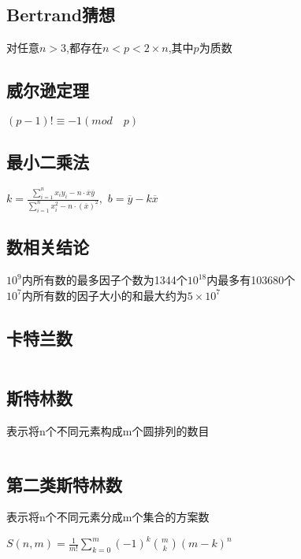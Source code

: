 \documentclass[twocolumn,a4]{article}
\begin{document}
\subsection{Bertrand猜想}
对任意$n>3$,都存在$n<p<2\times n$,其中$p$为质数\\

\subsection{威尔逊定理}
\begin{LARGE}
    $(p-1)!\equiv -1(mod\quad p)$
\end{LARGE}

\subsection{最小二乘法}
\begin{LARGE}
    $\displaystyle k=\frac{\sum_{i=1}^{n}x_{i}y_{i}-n\cdot\overline{x}\overline{y}}{\sum_{i=1}^{n}x_{i}^{2}-n\cdot (\overline{x})^{2}} ,$
    $b=\overline{y}-k\overline{x}$
\end{LARGE}

\subsection{数相关结论}
$10^{9}$内所有数的最多因子个数为1344个$10^{18}$内最多有103680个\\
$10^{7}$内所有数的因子大小的和最大约为$5\times 10^{7}$\\
\subsection{卡特兰数}
\begin{lstlisting}

\end{lstlisting}

\subsection{斯特林数}
表示将n个不同元素构成m个圆排列的数目
\begin{lstlisting}

\end{lstlisting}

\subsection{第二类斯特林数}
表示将n个不同元素分成m个集合的方案数\\
\begin{large}
    $S(n,m)=\frac{1}{m!}\sum_{k=0}^{m}(-1)^{k}\binom{m}{k}(m-k)^{n} $
\end{large}
\end{document}
